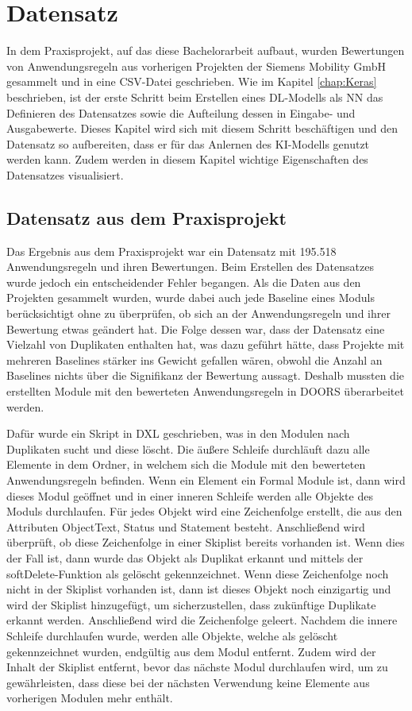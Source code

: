 \chapter{Datensatz}
\label{chap:Datensatz}
In dem Praxisprojekt, auf das diese Bachelorarbeit aufbaut, wurden Bewertungen von Anwendungsregeln aus vorherigen Projekten der Siemens Mobility GmbH gesammelt und in eine CSV-Datei geschrieben.
Wie im Kapitel \ref{chap:Keras} beschrieben, ist der erste Schritt beim Erstellen eines \ac{DL}-Modells als \ac{NN} das Definieren des Datensatzes sowie die Aufteilung
dessen in Eingabe- und Ausgabewerte. Dieses Kapitel wird sich mit diesem Schritt beschäftigen und den Datensatz so aufbereiten, dass er für das Anlernen des \ac{KI}-Modells genutzt werden
kann. Zudem werden in diesem Kapitel wichtige Eigenschaften des Datensatzes visualisiert.

\section{Datensatz aus dem Praxisprojekt}
\label{chap:DataPraxisprojekt}
Das Ergebnis aus dem Praxisprojekt war ein Datensatz mit 195.518 Anwendungsregeln und ihren Bewertungen. Beim Erstellen des Datensatzes wurde jedoch ein entscheidender Fehler begangen.
Als die Daten aus den Projekten gesammelt wurden, wurde dabei auch jede Baseline eines Moduls berücksichtigt ohne zu überprüfen, ob sich an der Anwendungsregeln und ihrer Bewertung
etwas geändert hat. Die Folge dessen war, dass der Datensatz eine Vielzahl von Duplikaten enthalten hat, was dazu geführt hätte, dass Projekte mit mehreren Baselines 
stärker ins Gewicht gefallen wären, obwohl die Anzahl an Baselines nichts über die Signifikanz der Bewertung aussagt. Deshalb mussten die erstellten Module mit den bewerteten Anwendungsregeln
in \ac{DOORS} überarbeitet werden. 

Dafür wurde ein Skript in \ac{DXL} geschrieben, was in den Modulen nach Duplikaten sucht und diese löscht. Die äußere Schleife durchläuft dazu alle 
Elemente in dem Ordner, in welchem sich die Module mit den bewerteten Anwendungsregeln befinden. Wenn ein Element ein Formal Module ist, 
dann wird dieses Modul geöffnet und in einer inneren Schleife werden alle Objekte des Moduls durchlaufen. Für jedes Objekt wird eine 
Zeichenfolge erstellt, die aus den Attributen ObjectText, Status und Statement besteht. Anschließend wird überprüft, ob diese Zeichenfolge
in einer Skiplist bereits vorhanden ist. Wenn dies der Fall ist, dann wurde das Objekt als Duplikat erkannt und mittels der softDelete-Funktion
als gelöscht gekennzeichnet. Wenn diese Zeichenfolge noch nicht in der Skiplist vorhanden ist, dann ist dieses Objekt noch einzigartig und wird der Skiplist
hinzugefügt, um sicherzustellen, dass zukünftige Duplikate erkannt werden. Anschließend wird die Zeichenfolge geleert. Nachdem die innere Schleife durchlaufen wurde,
werden alle Objekte, welche als gelöscht gekennzeichnet wurden, endgültig aus dem Modul entfernt. Zudem wird der Inhalt der Skiplist entfernt, bevor das nächste Modul durchlaufen wird, um 
zu gewährleisten, dass diese bei der nächsten Verwendung keine Elemente aus vorherigen Modulen mehr enthält.

